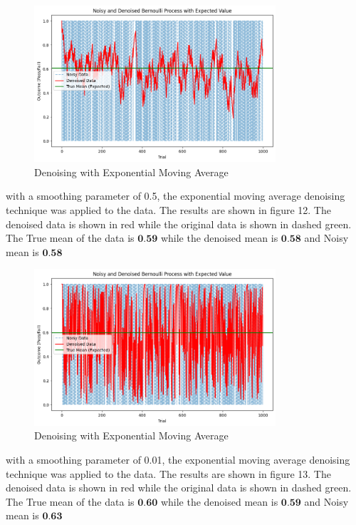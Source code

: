 \documentclass[a4paper,12pt]{article} %
\begin{document}
\begin{figure}[h]
\centering
\includegraphics[width=0.8\textwidth]{exp_0.1.png}
\caption{Denoising with Exponential Moving Average}
\end{figure}
\clearpage
with a smoothing parameter of 0.5, the exponential moving average denoising technique was applied to the data. The results are shown in figure 12. The denoised data is shown in red while the original data is shown in dashed green. The True mean of the data is \(\textbf{0.59}\) while the denoised mean is \(\textbf{0.58}\) and Noisy mean is \(\textbf{0.58}\)
\begin{figure}[h]
\centering
\includegraphics[width=0.8\textwidth]{exp_0..png}
\caption{Denoising with Exponential Moving Average}
\end{figure}
\clearpage
with a smoothing parameter of 0.01, the exponential moving average denoising technique was applied to the data. The results are shown in figure 13. The denoised data is shown in red while the original data is shown in dashed green. The True mean of the data is \(\textbf{0.60}\) while the denoised mean is \(\textbf{0.59}\) and Noisy mean is \(\textbf{0.63}\)
\end{document}
